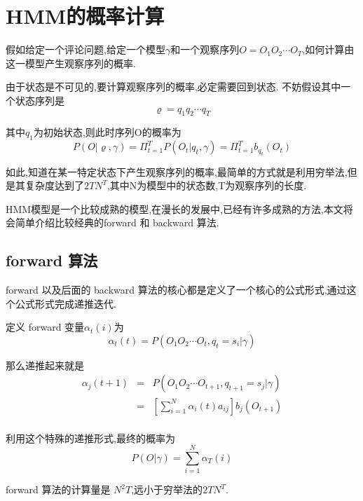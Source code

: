 \documentclass[a4paper]{ctexart}
\begin{document}
\section{HMM的概率计算}
\par 假如给定一个评论问题,给定一个模型$\gamma$和一个观察序列$O=O_1O_2\cdots O_T$,如何计算由这一模型产生观察序列的概率.
\par 由于状态是不可见的,要计算观察序列的概率,必定需要回到状态. 不妨假设其中一个状态序列是
\begin{equation}
    \varrho = q_1 q_2 \cdots q_T
\end{equation}
\par 其中$q_1$为初始状态,则此时序列O的概率为
\begin{equation}
    P(O|\varrho, \gamma) = \Pi_{t=1}^{T}P(O_t|q_t,\gamma) = \Pi_{t=1}^{T}b_{q_t}(O_{t}) 
\end{equation}
\par 如此,知道在某一特定状态下产生观察序列的概率,最简单的方式就是利用穷举法,但是其复杂度达到了$2TN^T$,其中N为模型中的状态数,T为观察序列的长度.

\par HMM模型是一个比较成熟的模型,在漫长的发展中,已经有许多成熟的方法,本文将会简单介绍比较经典的forward 和 backward 算法.

\subsection{forward 算法}
\par forward 以及后面的 backward 算法的核心都是定义了一个核心的公式形式,通过这个公式形式完成递推迭代.
\par 定义 forward 变量$\alpha_{t}(i)$为
\begin{equation}
    \alpha_{t}(t) = P(O_1 O_2 \cdots O_t, q_t = s_i | \gamma)
\end{equation}
\par 那么递推起来就是
\begin{eqnarray*}
    \alpha_{j}(t+1)     &   =   &   P(O_1 O_2 \cdots O_{t+1}, q_{t+1} = s_{j}| \gamma)\\
    &   =   &   \left[ \sum_{i=1}^{N}\alpha_{i}(t) a_{ij} \right]b_{j}(O_{t+1})\\
\end{eqnarray*}
\par 利用这个特殊的递推形式,最终的概率为
\begin{equation}
    P(O|\gamma) = \sum_{i=1}^{N} \alpha_{T}(i)
\end{equation}
\par forward 算法的计算量是 $N^{2}T$,远小于穷举法的$2TN^T$.
\end{document}
